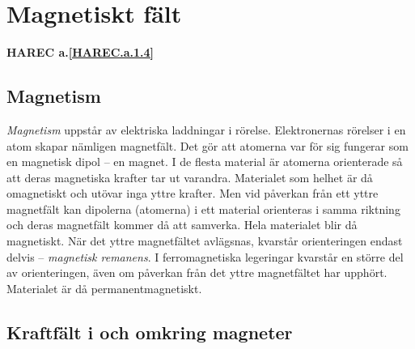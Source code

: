 \section{Magnetiskt fält}
\textbf{HAREC a.\ref{HAREC.a.1.4}\label{myHAREC.a.1.4}}
\label{elektromagnetiskafält}

\subsection{Magnetism}


\emph{Magnetism} uppstår av elektriska laddningar i rörelse. Elektronernas rörelser i
en atom skapar nämligen magnetfält. Det gör att atomerna var för sig fungerar
som en magnetisk dipol -- en magnet. I de flesta material är atomerna
orienterade så att deras magnetiska krafter tar ut varandra. Materialet som
helhet är då omagnetiskt och utövar inga yttre krafter. Men vid påverkan från
ett yttre magnetfält kan dipolerna (atomerna) i ett material orienteras i samma
riktning och deras magnetfält kommer då att samverka. Hela materialet blir då
magnetiskt. När det yttre magnetfältet avlägsnas, kvarstår orienteringen endast
delvis -- \emph{magnetisk remanens}. I ferromagnetiska legeringar kvarstår en
större del av orienteringen, även om påverkan från det yttre magnetfältet har
upphört. Materialet är då permanentmagnetiskt.

\subsection{Kraftfält i och omkring magneter}

